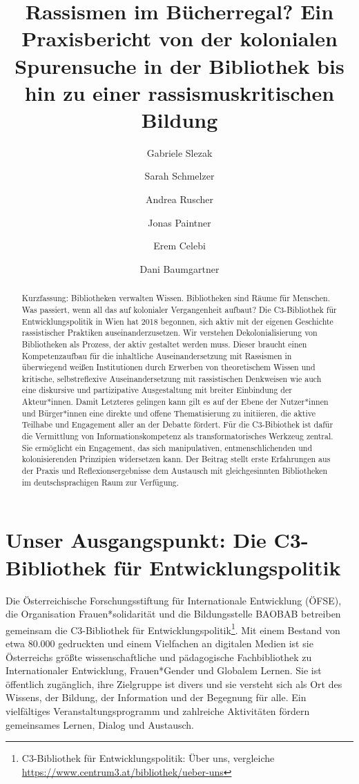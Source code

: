 \documentclass[a4paper,
fontsize=11pt,
oneside,
numbers=noperiodatend,
parskip=half-,
bibliography=totoc,
final
]{scrartcl}
\title{\LARGE{Rassismen im Bücherregal? Ein Praxisbericht von der kolonialen Spurensuche in der Bibliothek bis hin zu einer rassismuskritischen Bildung}}%
\author{Gabriele Slezak \and Sarah Schmelzer \and Andrea Ruscher \and Jonas Paintner \and Erem Celebi \and Dani Baumgartner} %
\date{}
\begin{document}
\maketitle
\thispagestyle{fancyplain} 

\begin{abstract}
\noindent
Kurzfassung: Bibliotheken verwalten Wissen. Bibliotheken sind Räume für
Menschen. Was passiert, wenn all das auf kolonialer Vergangenheit
aufbaut? Die C3-Bibliothek für Entwicklungspolitik in Wien hat 2018
begonnen, sich aktiv mit der eigenen Geschichte rassistischer Praktiken
auseinanderzusetzen. Wir verstehen Dekolonialisierung von Bibliotheken
als Prozess, der aktiv gestaltet werden muss. Dieser braucht einen
Kompetenzaufbau für die inhaltliche Auseinandersetzung mit Rassismen in
überwiegend weißen Institutionen durch Erwerben von theoretischem Wissen
und kritische, selbstreflexive Auseinandersetzung mit rassistischen
Denkweisen wie auch eine diskursive und partizipative Ausgestaltung mit
breiter Einbindung der Akteur*innen. Damit Letzteres gelingen kann gilt
es auf der Ebene der Nutzer*innen und Bürger*innen eine direkte und
offene Thematisierung zu initiieren, die aktive Teilhabe und Engagement
aller an der Debatte fördert. Für die C3-Bibiothek ist dafür die
Vermittlung von Informationskompetenz als transformatorisches Werkzeug
zentral. Sie ermöglicht ein Engagement, das sich manipulativen,
entmenschlichenden und kolonisierenden Prinzipien widersetzen kann. Der
Beitrag stellt erste Erfahrungen aus der Praxis und Reflexionsergebnisse
dem Austausch mit gleichgesinnten Bibliotheken im deutschsprachigen Raum
zur Verfügung.
\end{abstract}

\hypertarget{unser-ausgangspunkt-die-c3-bibliothek-fuxfcr-entwicklungspolitik}{%
\section{Unser Ausgangspunkt: Die C3-Bibliothek für
Entwicklungspolitik}\label{unser-ausgangspunkt-die-c3-bibliothek-fuxfcr-entwicklungspolitik}}

Die Österreichische Forschungsstiftung für Internationale Entwicklung
(ÖFSE), die Organisation Frauen*solidarität und die Bildungsstelle
BAOBAB betreiben gemeinsam die C3-Bibliothek für
Entwicklungspolitik\footnote{C3-Bibliothek für Entwicklungspolitik: Über
  uns, vergleiche \url{https://www.centrum3.at/bibliothek/ueber-uns}}.
Mit einem Bestand von etwa 80.000 gedruckten und einem Vielfachen an
digitalen Medien ist sie Österreichs größte wissenschaftliche und
pädagogische Fachbibliothek zu Internationaler Entwicklung,
Frauen*Gender und Globalem Lernen. Sie ist öffentlich zugänglich, ihre
Zielgruppe ist divers und sie versteht sich als Ort des Wissens, der
Bildung, der Information und der Begegnung für alle. Ein vielfältiges
Veranstaltungsprogramm und zahlreiche Aktivitäten fördern gemeinsames
Lernen, Dialog und Austausch.
\end{document}

